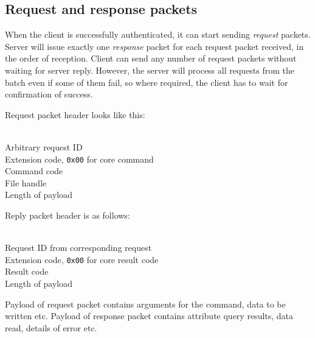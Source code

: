%

\subsection{Request and response packets}

When the client is successfully authenticated, it can start sending {\it request} packets. Server will issue
exactly one {\it response} packet for each request packet received, in the order of reception. Client can send
any number of request packets without waiting for server reply. However, the server will process all requests
from the batch even if some of them fail, so where required, the client has to wait for confirmation of
success.

\begin{samepage}
Request packet header looks like this:
\begin{description}[parsep=1pt]
	 \hfill \\
		Arbitrary request ID
	 \hfill \\
		Extension code, {\tt 0x00} for core command
	 \hfill \\
		Command code
	 \hfill \\
		File handle
	 \hfill \\
		Length of payload
\end{description}
\end{samepage}

\begin{samepage}
Reply packet header is as follows:
\begin{description}[parsep=1pt]
	 \hfill \\
		Request ID from corresponding request
	 \hfill \\
		Extension code, {\tt 0x00} for core result code
	 \hfill \\
		Result code
	 \hfill \\
		Length of payload
\end{description}
\end{samepage}

Payload of request packet contains arguments for the command, data to be written etc. Payload of response
packet contains attribute query results, data read, details of error etc. 

